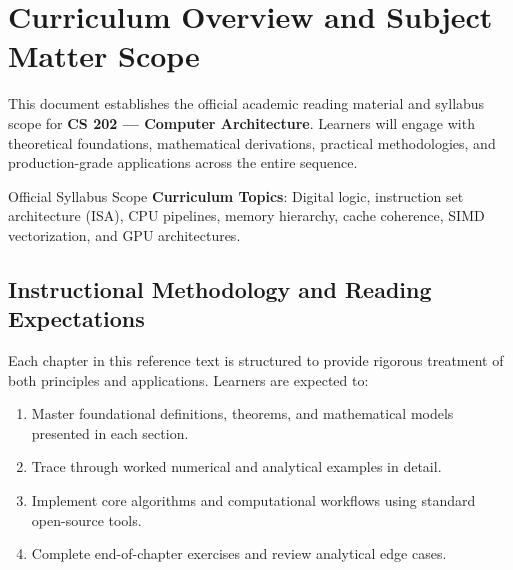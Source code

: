\section{Curriculum Overview and Subject Matter Scope}

This document establishes the official academic reading material and syllabus scope for \textbf{CS 202 --- Computer Architecture}. Learners will engage with theoretical foundations, mathematical derivations, practical methodologies, and production-grade applications across the entire sequence.

\begin{InsightBox}{Official Syllabus Scope}
  \textbf{Curriculum Topics}: Digital logic, instruction set architecture (ISA), CPU pipelines, memory hierarchy, cache coherence, SIMD vectorization, and GPU architectures.
\end{InsightBox}

\subsection{Instructional Methodology and Reading Expectations}

Each chapter in this reference text is structured to provide rigorous treatment of both principles and applications. Learners are expected to:
\begin{enumerate}
  \item Master foundational definitions, theorems, and mathematical models presented in each section.
  \item Trace through worked numerical and analytical examples in detail.
  \item Implement core algorithms and computational workflows using standard open-source tools.
  \item Complete end-of-chapter exercises and review analytical edge cases.
\end{enumerate}

